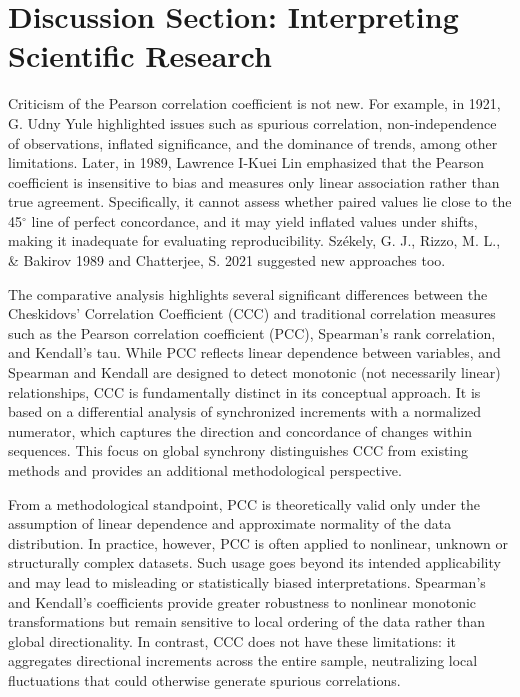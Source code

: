 \documentclass[aos]{imsart}
\begin{document}
\section{Discussion Section: Interpreting Scientific Research}

Criticism of the Pearson correlation coefficient is not new. For example, in 1921, G. Udny Yule \cite{r1} highlighted issues such as spurious correlation, non-independence of observations, inflated significance, and the dominance of trends, among other limitations. Later, in 1989, Lawrence I-Kuei Lin \cite{r2} emphasized that the Pearson coefficient is insensitive to bias and measures only linear association rather than true agreement. Specifically, it cannot assess whether paired values lie close to the 45$^\circ$ line of perfect concordance, and it may yield inflated values under shifts, making it inadequate for evaluating reproducibility. Sz\'ekely, G. J., Rizzo, M. L., \& Bakirov 1989 \cite{r4} and Chatterjee, S. 2021 \cite{r5} suggested new approaches too. 

The comparative analysis highlights several significant differences between the Cheskidovs' Correlation Coefficient (CCC) and traditional correlation measures such as the Pearson correlation coefficient (PCC), Spearman’s rank correlation, and Kendall’s tau. While PCC reflects linear dependence between variables, and Spearman and Kendall are designed to detect monotonic (not necessarily linear) relationships, CCC is fundamentally distinct in its conceptual approach. It is based on a differential analysis of synchronized increments with a normalized numerator, which captures the direction and concordance of changes within sequences. This focus on global synchrony distinguishes CCC from existing methods and provides an additional methodological perspective.

From a methodological standpoint, PCC is theoretically valid only under the assumption of linear dependence and approximate normality of the data distribution. In practice, however, PCC is often applied to nonlinear, unknown or structurally complex datasets. Such usage goes beyond its intended applicability and may lead to misleading or statistically biased interpretations. Spearman’s and Kendall’s coefficients provide greater robustness to nonlinear monotonic transformations but remain sensitive to local ordering of the data rather than global directionality. In contrast, CCC does not have these limitations: it aggregates directional increments across the entire sample, neutralizing local fluctuations that could otherwise generate spurious correlations.
\end{document}
